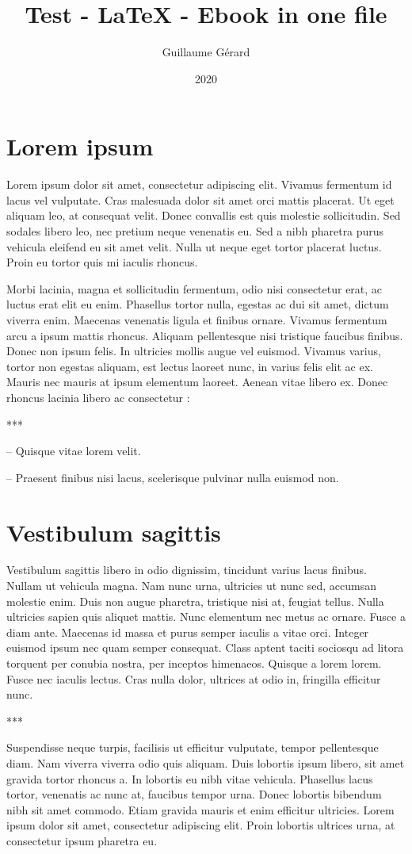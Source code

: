 \documentclass{book}
\title{Test - LaTeX - Ebook in one file}
\author{Guillaume Gérard}
\date{2020}
\begin{document}
\chapter{Lorem ipsum}

Lorem ipsum dolor sit amet, consectetur adipiscing elit. Vivamus fermentum id lacus vel vulputate. Cras malesuada dolor sit amet orci mattis placerat. Ut eget aliquam leo, at consequat velit. Donec convallis est quis molestie sollicitudin. Sed sodales libero leo, nec pretium neque venenatis eu. Sed a nibh pharetra purus vehicula eleifend eu sit amet velit. Nulla ut neque eget tortor placerat luctus. Proin eu tortor quis mi iaculis rhoncus.

Morbi lacinia, magna et sollicitudin fermentum, odio nisi consectetur erat, ac luctus erat elit eu enim. Phasellus tortor nulla, egestas ac dui sit amet, dictum viverra enim. Maecenas venenatis ligula et finibus ornare. Vivamus fermentum arcu a ipsum mattis rhoncus. Aliquam pellentesque nisi tristique faucibus finibus. Donec non ipsum felis. In ultricies mollis augue vel euismod. Vivamus varius, tortor non egestas aliquam, est lectus laoreet nunc, in varius felis elit ac ex. Mauris nec mauris at ipsum elementum laoreet. Aenean vitae libero ex. Donec rhoncus lacinia libero ac consectetur :

\centerline{***}

-- Quisque vitae lorem velit.

-- Praesent finibus nisi lacus, scelerisque pulvinar nulla euismod non.

\chapter{Vestibulum sagittis}

Vestibulum sagittis libero in odio dignissim, tincidunt varius lacus finibus. Nullam ut vehicula magna. Nam nunc urna, ultricies ut nunc sed, accumsan molestie enim. Duis non augue pharetra, tristique nisi at, feugiat tellus. Nulla ultricies sapien quis aliquet mattis. Nunc elementum nec metus ac ornare. Fusce a diam ante. Maecenas id massa et purus semper iaculis a vitae orci. Integer euismod ipsum nec quam semper consequat. Class aptent taciti sociosqu ad litora torquent per conubia nostra, per inceptos himenaeos. Quisque a lorem lorem. Fusce nec iaculis lectus. Cras nulla dolor, ultrices at odio in, fringilla efficitur nunc.

\centerline{***}

Suspendisse neque turpis, facilisis ut efficitur vulputate, tempor pellentesque diam. Nam viverra viverra odio quis aliquam. Duis lobortis ipsum libero, sit amet gravida tortor rhoncus a. In lobortis eu nibh vitae vehicula. Phasellus lacus tortor, venenatis ac nunc at, faucibus tempor urna. Donec lobortis bibendum nibh sit amet commodo. Etiam gravida mauris et enim efficitur ultricies. Lorem ipsum dolor sit amet, consectetur adipiscing elit. Proin lobortis ultrices urna, at consectetur ipsum pharetra eu.
\end{document}
